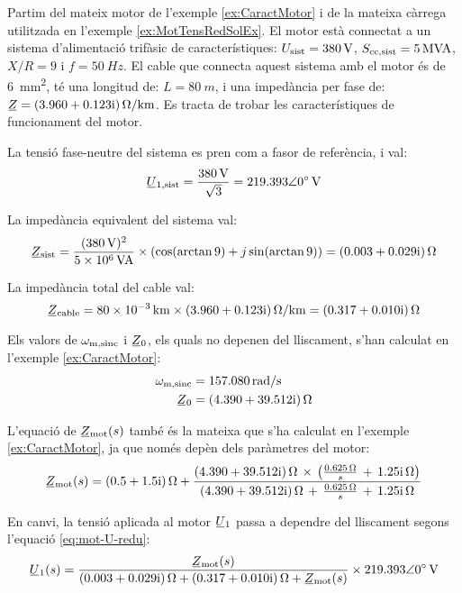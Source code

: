\begin{exemple}\label{ex:MotTensRedIarr}
	\addcontentsxms{\MotTensRedIarr}
	Partim del mateix motor de l'exemple \vref{ex:CaractMotor} i de la mateixa càrrega utilitzada en l'exemple \vref{ex:MotTensRedSolEx}. El motor està connectat a un sistema d'alimentació trifàsic de característiques: $U_\mathrm{sist}=\qty{380}{V}$, $S_\mathrm{cc,sist}=\qty{5}{MVA}$, $X/R=9$ i $f=\qty{50}{Hz}$. El cable que connecta aquest sistema amb el motor és de \qty{6}{mm^2}, té una longitud de:  $L=\qty{80}{m}$, i una impedància per fase de: $\cmplx{Z} = \complexqty{3,960+j0,123}{\ohm/km}$. Es tracta de trobar les característiques de funcionament del motor.
	
	La tensió fase-neutre del sistema es pren com a fasor de referència, i val:
	\[
		\cmplx{U}\ped{1,sist} = \frac{\qty{380}{V}}{\sqrt{3}} = \complexqty{219,393:0}{V}
	\]
	
	La impedància equivalent del sistema val:
	\[
		\cmplx{Z}\ped{sist} = \frac{(\qty{380}{V})^2}{\qty{5e6}{VA}} \times (\cos(\arctan 9) + j \sin(\arctan 9)) = \complexqty{0,003+j0,029}{\ohm}	
	\]
	
	La impedància total del cable val:
	\[
		\cmplx{Z}\ped{cable} = \qty{80e-3}{km} \times \complexqty{3,960+j0,123}{\ohm/km} = \complexqty{0,317+j0,010}{\ohm}
	\]
	
	Els valors de $\omega_\mathrm{m,sinc}$ i $\cmplx{Z}_0$, els quals no depenen del lliscament, s'han calculat en  l'exemple \ref{ex:CaractMotor}:
	\begin{align*}
		\omega\ped{m,sinc} &=  \qty{157,080}{rad/s} \\
		\cmplx{Z}_0 &=  \complexqty{4,390+j39,512}{\ohm} 
	\end{align*}
		
	L'equació de $\cmplx{Z}\ped{mot}(s)$ també és la mateixa que s'ha calculat en l'exemple  \ref{ex:CaractMotor}, ja que només depèn dels paràmetres del motor:
	\[
		\cmplx{Z}\ped{mot}(s) = \complexqty{0,5+j1,5}{\ohm} + \frac{\complexqty{4,390+j39,512}{\ohm}\,\times\,
		\left(\tfrac{\qty{0,625}{\ohm}}{s}\, + \, \complexqty{j1,25}{\ohm}\right)}{\complexqty{4,390+j39,512}{\ohm}\,+\,
		\tfrac{\qty{0,625}{\ohm}}{s}\, + \,\complexqty{j1,25}{\ohm}}  
	\] 
	
	En canvi, la tensió aplicada al motor $\cmplx{U}_1$ passa a dependre del lliscament segons l'equació \eqref{eq:mot-U-redu}:
	\[
		\cmplx{U}_1(s) = \frac{\cmplx{Z}\ped{mot}(s)}{\complexqty{0,003+j0,029}{\ohm} + \complexqty{0,317+j0,010}{\ohm}  +  \cmplx{Z}\ped{mot}(s)} \times \complexqty{219,393:0}{V}
	\]
	

\end{exemple}
